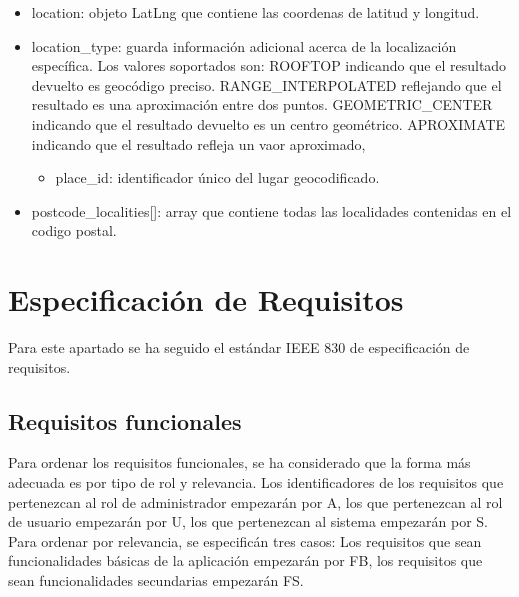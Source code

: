 \begin{itemize}

\item location: objeto LatLng que contiene las coordenas de latitud y longitud.

\item location\_type: guarda información adicional acerca de la localización específica. Los valores soportados son: ROOFTOP indicando que el resultado devuelto es geocódigo preciso. RANGE\_INTERPOLATED reflejando que el resultado es una aproximación entre dos puntos. GEOMETRIC\_CENTER indicando que el resultado devuelto es un centro geométrico. APROXIMATE indicando que el resultado refleja un vaor aproximado,

\begin{itemize}

\item place\_id: identificador único del lugar geocodificado.


\end{itemize} 

\item postcode\_localities[]: array que contiene todas las localidades contenidas en el codigo postal.

\end{itemize}

\section{Especificación de Requisitos}

Para este apartado se ha seguido el estándar IEEE 830 de especificación de requisitos.

\subsection{Requisitos funcionales}

Para ordenar los requisitos funcionales, se ha considerado que la forma más adecuada es por tipo de rol y relevancia. Los identificadores de los requisitos que pertenezcan al rol de administrador empezarán por A, los que pertenezcan al rol de usuario empezarán por U, los que pertenezcan al sistema empezarán por S. Para ordenar por relevancia, se especificán tres casos: Los requisitos que sean funcionalidades básicas de la aplicación empezarán por FB, los requisitos que sean funcionalidades secundarias empezarán FS.

\vspace{5 mm}


